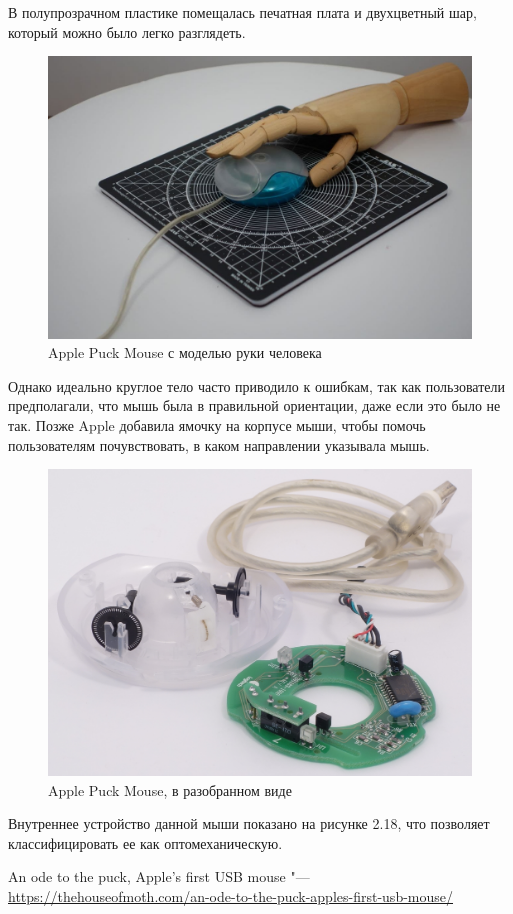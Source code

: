 \documentclass[11pt, a4paper]{article}
\begin{document}
В полупрозрачном пластике помещалась печатная плата и двухцветный шар, который можно было легко разглядеть. 
\begin{figure}[h]
    \centering
    \includegraphics[scale=0.25]{1998_apple_puck/appleset2.jpg}
    \caption{Apple Puck Mouse с моделью руки человека}
    \label{fig:hand}
\end{figure}

Однако идеально круглое тело часто приводило к ошибкам, так как пользователи предполагали, что мышь была в правильной ориентации, даже если это было не так. Позже Apple добавила ямочку на корпусе мыши, чтобы помочь пользователям почувствовать, в каком направлении указывала мышь.
\begin{figure}[h]
    \centering
    \includegraphics[scale=0.3]{1998_apple_puck/apple2.jpg}
    \caption{Apple Puck Mouse, в разобранном виде}
    \label{fig:inside}
\end{figure}

Внутреннее устройство данной мыши показано на рисунке 2.18, что позволяет классифицировать  ее как оптомеханическую.

\begin{thebibliography}{9}

     An ode to the puck, Apple's first USB mouse "---
    \url{https://thehouseofmoth.com/an-ode-to-the-puck-apples-first-usb-mouse/}

\end{thebibliography}
\end{document}
